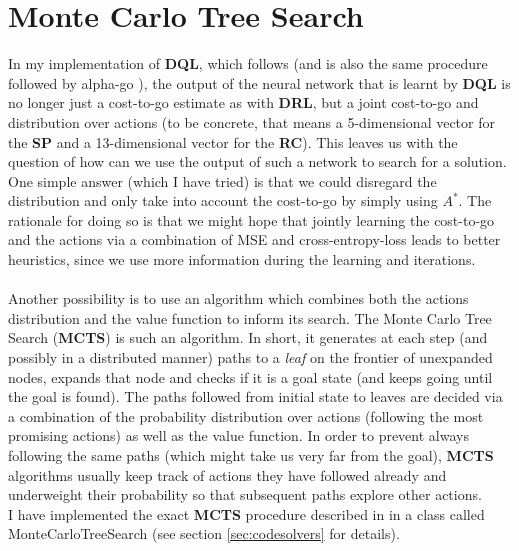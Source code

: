 \section{Monte Carlo Tree Search}

In my implementation of \textbf{DQL}, which follows \cite{https://doi.org/10.48550/arxiv.1805.07470} (and is also the same procedure followed by alpha-go \cite{AlphaGo}), the output of the neural network that is learnt by \textbf{DQL} is no longer just a cost-to-go estimate as with \textbf{DRL}, but a joint cost-to-go and distribution over actions (to be concrete, that means a 5-dimensional vector for the \textbf{SP} and a 13-dimensional vector for the \textbf{RC}). This leaves us with the question of how can we use the output of such a network to search for a solution. One simple answer (which I have tried) is that we could disregard the distribution and only take into account the cost-to-go by simply using $A^{*}$. The rationale for doing so is that we might hope that jointly learning the cost-to-go and the actions via a combination of MSE and cross-entropy-loss leads to better heuristics, since we use more information during the learning and iterations.
\\
\\
Another possibility is to use an algorithm which combines both the actions distribution and the value function to inform its search. The Monte Carlo Tree Search (\textbf{MCTS}) is such an algorithm. In short, it generates at each step (and possibly in a distributed manner) paths to a \textit{leaf} on the frontier of unexpanded nodes, expands that node and checks if it is a goal state (and keeps going until the goal is found). The paths followed from initial state to leaves are decided via a combination of the probability distribution over actions (following the most promising actions) as well as the value function. In order to prevent always following the same paths (which might take us very far from the goal), \textbf{MCTS} algorithms usually keep track of actions they have followed already and underweight their probability so that subsequent paths explore other actions.
\\
I have implemented the exact \textbf{MCTS} procedure described in \cite{https://doi.org/10.48550/arxiv.1805.07470} in a class called MonteCarloTreeSearch (see section \ref{sec:codesolvers} for details).





































